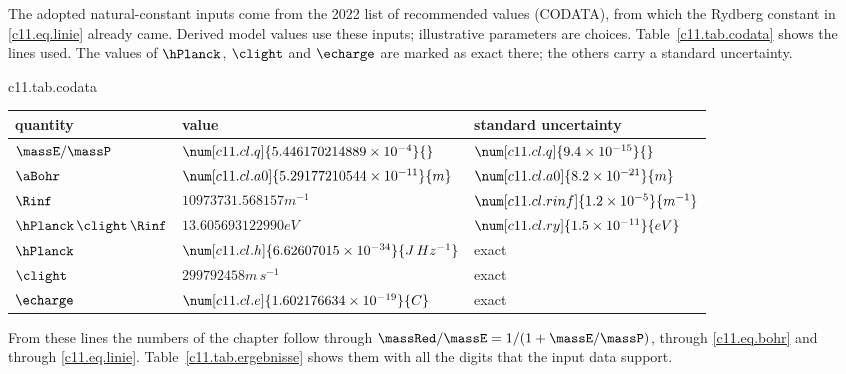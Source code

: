 \begin{vertiefung}[id=c11.v4,
    titel={How accurate are the numbers?},
    wozu={The Core text gives energies and wavelengths to a few digits. Here are the
      input data, the full results, and the information how many of their digits mean
      something.},
    voraussetzung={Core~\ref{c11.s4} and \ref{c11.s6}. Not needed for
      Section~\ref{c11.s7}.},
    zurueck={The calculation is accurate to many digits. What these digits mean
      physically is decided by the model, not by the arithmetic.}]
  The adopted natural-constant inputs come from the 2022 list of recommended values
  (CODATA), from which the Rydberg constant in \eqref{c11.eq.linie} already came.
  Derived model values use these inputs; illustrative parameters are choices.
  Table~\ref{c11.tab.codata} shows the lines used. The values of $\hPlanck$, $\clight$ and $\echarge$ are marked
  as exact there; the others carry a standard uncertainty.

  \begin{tpctable}{c11.tab.codata}
    \caption{Input data: value and standard uncertainty as they stand in the list.}
    \begin{tabular}{lll}
      \toprule
      quantity & value & standard uncertainty \\
      \midrule
      $\massE/\massP$ & $\num[c11.cl.q]{5.446170214889 \times 10^{-4}}{}$
        & $\num[c11.cl.q]{9.4 \times 10^{-15}}{}$ \\
      $\aBohr$ & $\num[c11.cl.a0]{5.29177210544 \times 10^{-11}}{m}$
        & $\num[c11.cl.a0]{8.2 \times 10^{-21}}{m}$ \\
      $\Rinf$ & $\num[c11.cl.rinf]{10973731.568157}{m^{-1}}$
        & $\num[c11.cl.rinf]{1.2 \times 10^{-5}}{m^{-1}}$ \\
      $\hPlanck\,\clight\,\Rinf$ & $\num[c11.cl.ry]{13.605693122990}{eV}$
        & $\num[c11.cl.ry]{1.5 \times 10^{-11}}{eV}$ \\
      $\hPlanck$ & $\num[c11.cl.h]{6.62607015 \times 10^{-34}}{J\,Hz^{-1}}$ & exact \\
      $\clight$ & $\num[c11.cl.c]{299792458}{m\,s^{-1}}$ & exact \\
      $\echarge$ & $\num[c11.cl.e]{1.602176634 \times 10^{-19}}{C}$ & exact \\
      \bottomrule
    \end{tabular}
  \end{tpctable}

  From these lines the numbers of the chapter follow through
  $\massRed/\massE = 1/(1 + \massE/\massP)$, through \eqref{c11.eq.bohr} and through
  \eqref{c11.eq.linie}. Table~\ref{c11.tab.ergebnisse} shows them with all the digits
  that the input data support.


\end{vertiefung}
